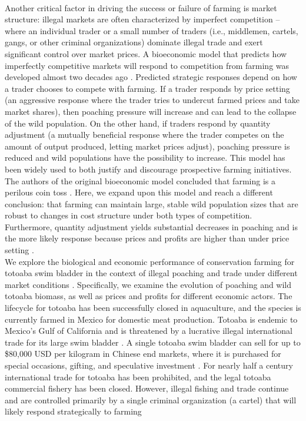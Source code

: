 \\
Another critical factor in driving the success or failure of farming is market structure: illegal markets are often characterized by imperfect competition – where an individual trader or a small number of traders (i.e., middlemen, cartels, gangs, or other criminal organizations) dominate illegal trade and exert significant control over market prices. A bioeconomic model that predicts how imperfectly competitive markets will respond to competition from farming was developed almost two decades ago \citep{bulte_economic_2005, damania_economics_2007}. Predicted strategic responses depend on how a trader chooses to compete with farming. If a trader responds by price setting (an aggressive response where the trader tries to undercut farmed prices and take market shares), then poaching pressure will increase and can lead to the collapse of the wild population. On the other hand, if traders respond by quantity adjustment (a mutually beneficial response where the trader competes on the amount of output produced, letting market prices adjust), poaching pressure is reduced and wild populations have the possibility to increase. This model has been widely used to both justify \citep{biggs_legal_2013,abbott_can_2011} and discourage \citep{tensen_under_2016} prospective farming initiatives. The authors of the original bioeconomic model concluded that farming is a perilous coin toss \citep{bulte_economic_2005, damania_economics_2007}. Here, we expand upon this model and reach a different conclusion: that farming can maintain large, stable wild population sizes that are robust to changes in cost structure under both types of competition. Furthermore, quantity adjustment yields substantial decreases in poaching and is the more likely response because prices and profits are higher than under price setting \citep{singh_price_1984}.
\\
We explore the biological and economic performance of conservation farming for totoaba swim bladder in the context of illegal poaching and trade under different market conditions \citep{froehlich_conservation_2017}. Specifically, we examine the evolution of poaching and wild totoaba biomass, as well as prices and profits for different economic actors. The lifecycle for totoaba has been successfully closed in aquaculture, and the species is currently farmed in Mexico for domestic meat production. Totoaba is endemic to Mexico’s Gulf of California and is threatened by a lucrative illegal international trade for its large swim bladder \citep{c4ads_hooked_2017, environmental_investigation_agency_citess_2019, environmental_investigation_agency_collateral_2016} . A single totoaba swim bladder can sell for up to \$80,000 USD per kilogram in Chinese end markets, where it is purchased for special occasions, gifting, and speculative investment \citep{elephant_action_league_operation_2018, sadovy_de_mitcheson_emerging_2019, martinez_mexican_2021}. For nearly half a century international trade for totoaba has been prohibited, and the legal totoaba commercial fishery has been closed. However, illegal fishing and trade continue and are controlled primarily by a single criminal organization (a cartel) that will likely respond strategically to farming \citep{damania_economics_2007,felbab_brown_organized_2022}  

